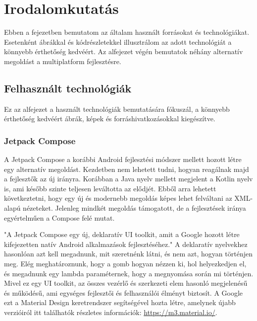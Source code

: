 \chapter{Irodalomkutatás}
\label{sec:Search}

Ebben a fejezetben bemutatom az általam használt forrásokat és technológiákat.  
Esetenként ábrákkal és kódrészletekkel illusztrálom az adott technológiát a könnyebb érthetőség kedvéért.  
Az alfejezet végén bemutatok néhány alternatív megoldást a multiplatform fejlesztésre.

\section{Felhasznált technológiák}
\label{sec:Technologies}

Ez az alfejezet a használt technológiák bemutatására fókuszál, a könnyebb érthetőség kedvéért ábrák, képek és forráshivatkozásokkal kiegészítve. 

\subsection{Jetpack Compose}
\label{sec:JetpackCompose}

A Jetpack Compose a korábbi Android fejlesztési módszer mellett hozott létre egy alternatív megoldást.  
Kezdetben nem lehetett tudni, hogyan reagálnak majd a fejlesztők az új irányra.  
Korábban a Java nyelv mellett megjelent a Kotlin nyelv is, ami később szinte teljesen leváltotta az elődjét.  
Ebből arra lehetett következtetni, hogy egy új és modernebb megoldás képes lehet felváltani az XML-alapú nézeteket.  
Jelenleg mindkét megoldás támogatott, de a fejlesztések iránya egyértelműen a Compose felé mutat.

"A Jetpack Compose egy új, deklaratív UI toolkit, amit a Google hozott létre kifejezetten natív Android alkalmazások fejlesztéséhez." \cite{GettingStartedWithJetpackCompose}  
A deklaratív nyelvekhez hasonlóan azt kell megadnunk, mit szeretnénk látni, és nem azt, hogyan történjen meg.  
Elég meghatároznunk, hogy a gomb hogyan nézzen ki, hol helyezkedjen el, és megadnunk egy lambda paraméternek, hogy a megnyomása során mi történjen.  
Mivel ez egy UI toolkit, az összes vezérlő és szerkezeti elem hasonló megjelenésű és működésű, ami egységes fejlesztői és felhasználói élményt biztosít.  
A Google ezt a Material Design keretrendszer segítségével hozta létre, amelynek újabb verzióiról itt találhatók részletes információk: \url{https://m3.material.io/}.

